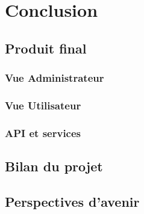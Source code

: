 \chapter{Conclusion}

\section{Produit final}
\subsection{Vue Administrateur}
\subsection{Vue Utilisateur}
\subsection{ API et services}

\section{ Bilan du projet}

\section{Perspectives d’avenir}
